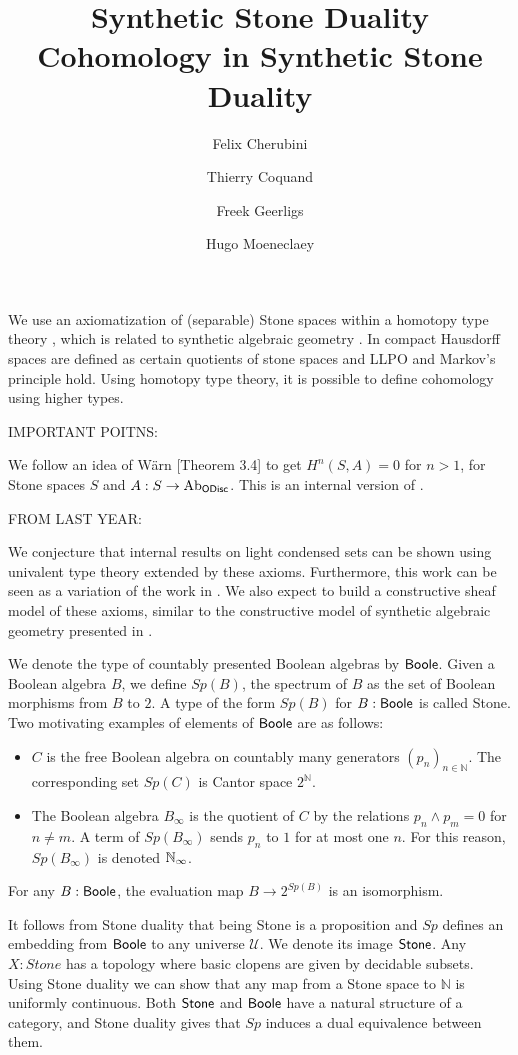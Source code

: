 \documentclass{../util/zariski}
\title{Synthetic Stone Duality 
}
\author{
Felix Cherubini %
\and 
 Thierry Coquand%
\and 
 Freek Geerligs%
\and
 Hugo Moeneclaey %
}
\title{Cohomology in Synthetic Stone Duality}
\begin{document}
\maketitle
We use an axiomatization of (separable) Stone spaces within a homotopy type theory \cite{synthetic-stone-duality}, which is related to synthetic algebraic geometry \cite{draft}.
In \cite{synthetic-stone-duality} compact Hausdorff spaces are defined as certain quotients of stone spaces and LLPO and Markov's principle hold.
Using homotopy type theory, it is possible to define cohomology using higher types.

IMPORTANT POITNS:

We follow an idea of Wärn \cite{cech-draft}[Theorem 3.4] to get $H^n(S,A)=0$ for $n>1$, for Stone spaces $S$ and $A : S\to \mathrm{Ab}_{\mathsf{ODisc}}$.
This is an internal version of \cite{dyckhoff76}.


FROM LAST YEAR:

We conjecture that internal results on light condensed sets \cite{Dagur,Scholze,Condensed} can be shown using univalent
type theory extended by these axioms.
Furthermore, this work can be seen as a variation of the work in \cite{XuE13}. We also expect to build a constructive
sheaf model of these axioms, similar to the constructive model of synthetic algebraic geometry presented in \cite{draft}.

\medskip

We denote the type of countably presented Boolean algebras by $\mathsf{Boole}$.
Given a Boolean algebra $B$, we define $Sp(B)$, the spectrum of $B$ as the set of Boolean morphisms from $B$ to $2$.  
A type of the form $Sp(B)$ for $B:\mathsf{Boole}$ is called Stone.
%
Two motivating examples of elements of $\mathsf{Boole}$ are as follows:
 \begin{itemize}
   \item $C$ is the free Boolean algebra on countably many generators $(p_n)_{n\in\mathbb N}$. 
     The corresponding set $Sp(C)$ is Cantor space $2^\mathbb N$. 
   \item 
     The Boolean algebra $ B_\infty$ is %
     the quotient of $C$ by the relations $p_n\wedge p_m = 0$ for $n\neq m$.  
     A term of $Sp(B_\infty)$ sends $p_n$ to $1$ for at most one $n$. 
     For this reason, $Sp(B_\infty)$ is denoted $\mathbb{N}_{\infty}$. 
  \end{itemize} 

\begin{axiom}
  For any 
  $B:\mathsf{Boole}$, 
  the evaluation map $B \to 2^{Sp(B)}$ is an isomorphism. 
\end{axiom}
It follows from Stone duality that being Stone is a proposition and $Sp$ defines an embedding from $\mathsf{Boole}$ 
to any universe $\mathcal U$. We denote its image $\mathsf{Stone}$. 
Any $X:Stone$ has a topology where basic clopens are given by decidable subsets. 
Using Stone duality we can show that any map from a Stone space to $\mathbb N$ is uniformly continuous. 
Both $\mathsf{Stone}$ and $\mathsf{Boole}$ have a natural structure of a category, and 
Stone duality gives that $Sp$ induces a dual equivalence between them. 
\end{document}
